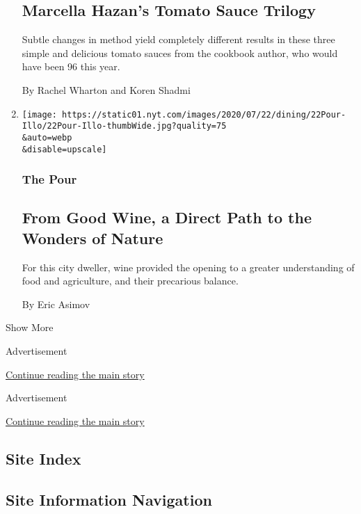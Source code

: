 \begin{enumerate}
  \hypertarget{marcella-hazans-tomato-sauce-trilogy}{%
  \subsection{Marcella Hazan's Tomato Sauce
  Trilogy}\label{marcella-hazans-tomato-sauce-trilogy}}

  Subtle changes in method yield completely different results in these
  three simple and delicious tomato sauces from the cookbook author, who
  would have been 96 this year.

  By Rachel Wharton and Koren Shadmi
\item
  \href{/2020/07/20/dining/drinks/wine-vineyard-viticulture-farming.html}{}

  \texttt{[image: https://static01.nyt.com/images/2020/07/22/dining/22Pour-Illo/22Pour-Illo-thumbWide.jpg?quality=75\\\&auto=webp\\\&disable=upscale]}

  \hypertarget{the-pour}{%
  \subsubsection{The Pour}\label{the-pour}}

  \hypertarget{from-good-wine-a-direct-path-to-the-wonders-of-nature}{%
  \subsection{From Good Wine, a Direct Path to the Wonders of
  Nature}\label{from-good-wine-a-direct-path-to-the-wonders-of-nature}}

  For this city dweller, wine provided the opening to a greater
  understanding of food and agriculture, and their precarious balance.

  By Eric Asimov
\end{enumerate}

Show More

Advertisement

\protect\hyperlink{after-mid2}{Continue reading the main story}

Advertisement

\protect\hyperlink{after-mktg}{Continue reading the main story}

\hypertarget{site-index}{%
\subsection{Site Index}\label{site-index}}

\hypertarget{site-information-navigation}{%
\subsection{Site Information
Navigation}\label{site-information-navigation}}

